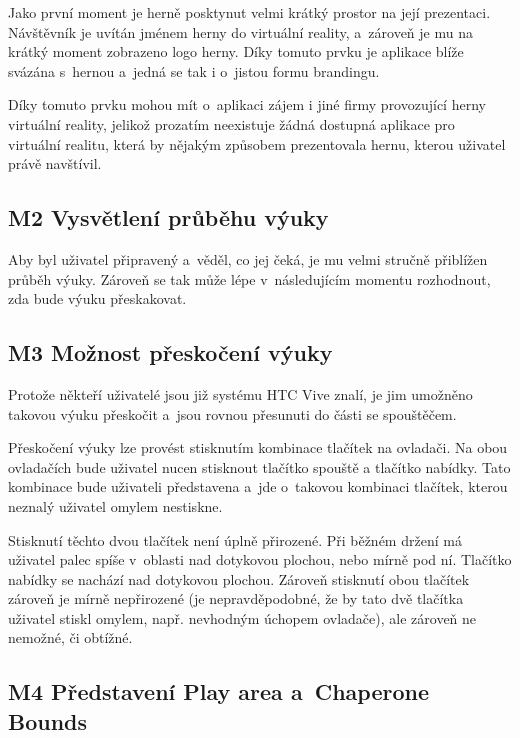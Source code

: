 Jako první moment je herně posktynut velmi krátký prostor na její
prezentaci. Návštěvník je uvítán jménem herny do virtuální
reality, a~zároveň je mu na krátký moment zobrazeno logo herny. Díky
tomuto prvku je aplikace blíže svázána s~hernou a~jedná se tak i
o~jistou formu brandingu.

Díky tomuto prvku mohou mít o~aplikaci zájem i jiné firmy provozující
herny virtuální reality, jelikož prozatím neexistuje žádná dostupná
aplikace pro virtuální realitu, která by nějakým způsobem prezentovala
hernu, kterou uživatel právě navštívil.

\subsection{M2 Vysvětlení průběhu
výuky}\label{m2-vysvux11btlenuxed-prux16fbux11bhu-vuxfduky}

Aby byl uživatel připravený a~věděl, co jej čeká, je mu velmi stručně
přiblížen průběh výuky. Zároveň se tak může lépe v~následujícím momentu
rozhodnout, zda bude výuku přeskakovat.

\subsection{M3 Možnost přeskočení
výuky}\label{m3-moux17enost-pux159eskoux10denuxed-vuxfduky}

Protože někteří uživatelé jsou již systému HTC Vive znalí, je jim
umožněno takovou výuku přeskočit a~jsou rovnou přesunuti do části se
spouštěčem.

Přeskočení výuky lze provést stisknutím kombinace tlačítek na ovladači.
Na obou ovladačích bude uživatel nucen stisknout tlačítko spouště a
tlačítko nabídky. Tato kombinace bude uživateli představena a~jde
o~takovou kombinaci tlačítek, kterou neznalý uživatel omylem nestiskne.

Stisknutí těchto dvou tlačítek není úplně přirozené. Při běžném držení
má uživatel palec spíše v~oblasti nad dotykovou plochou, nebo mírně pod
ní. Tlačítko nabídky se nachází nad dotykovou plochou. Zároveň stisknutí
obou tlačítek zároveň je mírně nepřirozené (je nepravděpodobné, že by
tato dvě tlačítka uživatel stiskl omylem, např. nevhodným úchopem
ovladače), ale zároveň ne nemožné, či obtížné.

\subsection{M4 Představení Play area a~Chaperone
Bounds}\label{m4-pux159edstavenuxed-play-area-a-chaperone-bounds}

